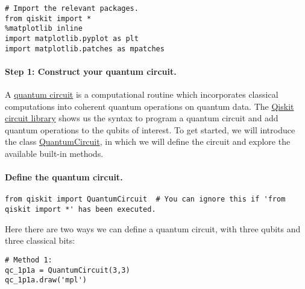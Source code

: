 \documentclass[%
oneside,                 %
final,                   %
10pt]{article}
\begin{document}
\begin{verbatim}
# Import the relevant packages.
from qiskit import * 
%matplotlib inline             
import matplotlib.pyplot as plt
import matplotlib.patches as mpatches

\end{verbatim}


\paragraph{Step 1: Construct your quantum circuit.}
A \href{{https://wiki2.org/en/Quantum_circuit}}{quantum circuit} is a
computational routine which incorporates classical computations into
coherent quantum operations on quantum data. The \href{{https://qiskit.org/documentation/apidoc/circuit_library.html}}{Qiskit circuit library}
shows us the syntax to program a quantum circuit and add quantum
operations to the qubits of interest. To get started, we will
introduce the class
\href{{https://qiskit.org/documentation/stubs/qiskit.circuit.QuantumCircuit.html}}{QuantumCircuit},
in which we will define the circuit and explore the available built-in
methods.

\paragraph{Define the quantum circuit.}


\begin{verbatim}
from qiskit import QuantumCircuit  # You can ignore this if 'from qiskit import *' has been executed.

\end{verbatim}


Here there are  two ways we can define a quantum circuit, with three qubits and three classical bits:





\begin{verbatim}
# Method 1: 
qc_1p1a = QuantumCircuit(3,3)  
qc_1p1a.draw('mpl')

\end{verbatim}
\end{document}
